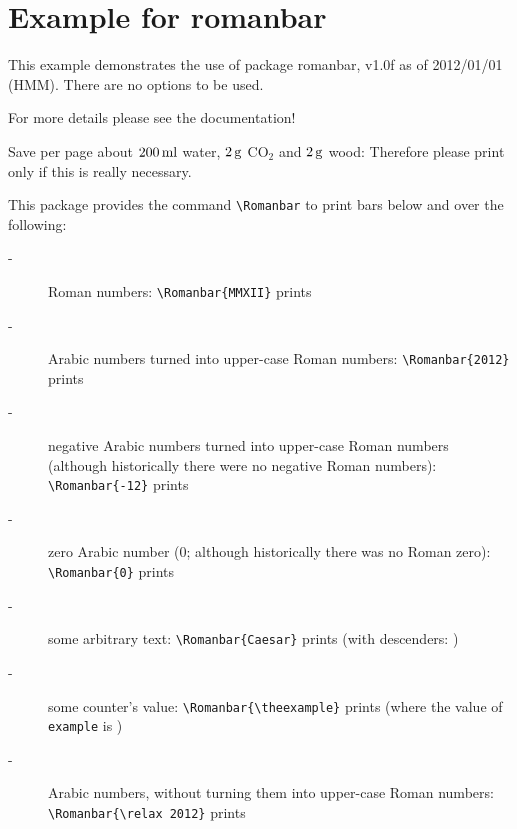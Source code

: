 \documentclass[british]{article}[2007/10/19]%
\gdef\unit#1{\mathord{\thinspace\mathrm{#1}}}%
\begin{document}
\section*{Example for romanbar}

This example demonstrates the use of package\newline
\textsf{romanbar}, v1.0f as of 2012/01/01 (HMM).\newline
There are no options to be used.\newline

\noindent For more details please see the documentation!\newline

\noindent Save per page about $200\unit{ml}$ water,
$2\unit{g}$ CO$_{2}$ and $2\unit{g}$ wood:\newline
Therefore please print only if this is really necessary.\newline

\noindent This package provides the command \verb|\Romanbar|
to print bars below and over the following:

\begin{description}
\item[-] Roman numbers: \verb|\Romanbar{MMXII}| prints 

\item[-] Arabic numbers turned into upper-case Roman numbers:\newline
           \verb|\Romanbar{2012}| prints 

\item[-] negative Arabic numbers turned into upper-case Roman numbers
           \newline
           (although historically there were no negative Roman numbers):
           \newline
           \verb|\Romanbar{-12}| prints 

\item[-] zero Arabic number ($0$; although historically
           there was no Roman zero):\newline
           \verb|\Romanbar{0}| prints 

\item[-] some arbitrary text:
           \verb|\Romanbar{Caesar}| prints \newline
           (with descenders: )

\setcounter{example}{21}

\item[-] some counter's value:
           \verb|\Romanbar{\theexample}| prints \Romanbar{\theexample}
           \newline
           (where the value of \texttt{example} is \theexample)

\item[-] Arabic numbers, without turning them into upper-case Roman
           numbers:\newline
           \verb|\Romanbar{\relax 2012}| prints 
\end{description}
\end{document}
